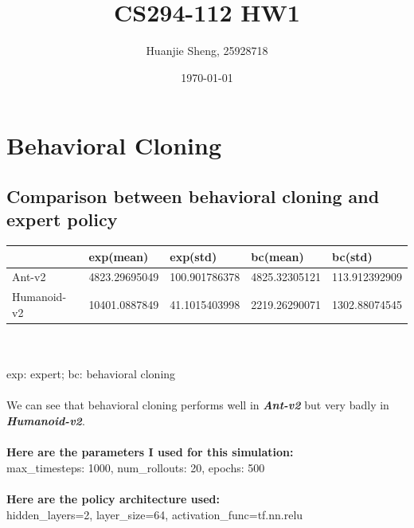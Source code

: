 \documentclass[12pt]{article}
\begin{document}
	\title{CS294-112 HW1\vspace{-2ex}}
	\author{Huanjie Sheng, 25928718\vspace{-2ex}}
	\date{\today \vspace{-2ex}}
	\maketitle
	
	\section{Behavioral Cloning}
	\subsection{Comparison between behavioral cloning and expert policy}
	
	\begin{tabu} to 1.0\textwidth {  |X[c] |X[c] |X[c] |X[c] |X[c] | }
		\hline
		& exp(mean) & exp(std) & bc(mean) & bc(std)\\
		\hline
		Ant-v2  & 4823.29695049 & 100.901786378 & 4825.32305121 & 113.912392909\\
		\hline
		
		Humanoid-v2  & 10401.0887849 & 41.1015403998 & 2219.26290071 & 1302.88074545\\
		\hline
		
	\end{tabu}\\ \\
	exp: expert; bc: behavioral cloning \\ \\
	We can see that behavioral cloning performs well in \textbf{\textit{Ant-v2}} but very badly in \textbf{\textit{Humanoid-v2}}.
	\\ \\
	\textbf{Here are the parameters I used for this simulation:}\\
	max\_timesteps: 1000, num\_rollouts: 20, epochs: 500 \\
	\\
	\textbf{Here are the policy architecture used:}\\
	hidden\_layers=2, layer\_size=64, activation\_func=tf.nn.relu 
	
\end{document}
